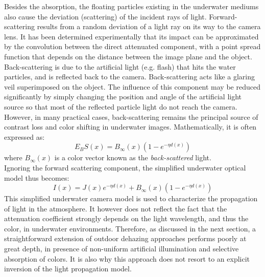 \documentclass[hidelinks, 12pt]{report}
\begin{document}
Besides the absorption, the floating particles existing in the underwater mediums also cause the deviation (scattering) of the incident rays of light. Forward-scattering results from a random deviation of a light ray on its way to the camera lens. It has been determined experimentally that its impact can be approximated by the convolution between the direct attenuated component, with a point spread function that depends on the distance between the image plane and the object. Back-scattering is due to the artificial light (e.g. flash) that hits the water particles, and is reflected back to the camera. Back-scattering acts like a glaring veil superimposed on the object. The influence of this component may be reduced significantly by simply changing the position and angle of the artificial light source so that most of the reflected particle light do not reach the camera. However, in many practical cases, back-scattering remains the principal source of contrast loss and color shifting in underwater images. Mathematically, it is often expressed as:
\begin{equation}
E_BS(x)=B_{\infty}(x)(1-e^{-\eta d(x)})
\end{equation}
where $B_{\infty}(x)$ is a color vector known as the \textit{back-scattered} light.\\
Ignoring the forward scattering component, the simplified underwater optical model thus becomes:
\begin{equation}
I(x)=J(x)e^{-\eta d(x)}+B_{\infty}(x)(1-e^{-\eta d(x)})
\end{equation}
This simplified underwater camera model is used to characterize the propagation of light in the atmosphere. It however does not reflect the fact that the attenuation coefficient strongly depends on the light wavelength, and thus the color, in underwater environments. Therefore, as discussed in the next section, a straightforward extension of outdoor dehazing approaches performs poorly at great depth, in presence of non-uniform artificial illumination and selective absorption of colors. It is also why this approach does not resort to an explicit inversion of the light propagation model.
\end{document}
